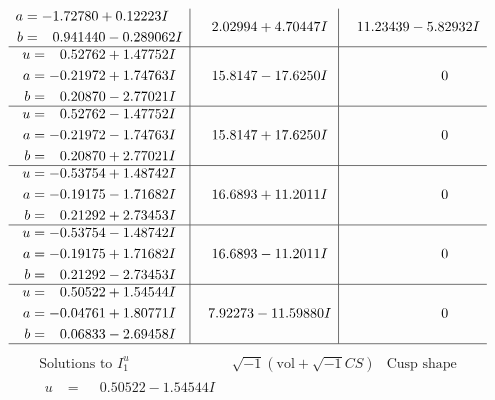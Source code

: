 \documentclass[1p]{elsarticle_modified}
\theoremstyle{definition}
\newcommand{\I}{\sqrt{-1}}
\begin{document}
$$\begin{array}{c|c|c}
\begin{aligned}
a &= -1.72780 + 0.12223 I \\
b &= \phantom{-}0.941440 - 0.289062 I\end{aligned}
 & \phantom{-}2.02994 + 4.70447 I & \phantom{-}11.23439 - 5.82932 I \\ \hline\begin{aligned}
u &= \phantom{-}0.52762 + 1.47752 I \\
a &= -0.21972 + 1.74763 I \\
b &= \phantom{-}0.20870 - 2.77021 I\end{aligned}
 & \phantom{-}15.8147 - 17.6250 I & \phantom{-0.000000 } 0 \\ \hline\begin{aligned}
u &= \phantom{-}0.52762 - 1.47752 I \\
a &= -0.21972 - 1.74763 I \\
b &= \phantom{-}0.20870 + 2.77021 I\end{aligned}
 & \phantom{-}15.8147 + 17.6250 I & \phantom{-0.000000 } 0 \\ \hline\begin{aligned}
u &= -0.53754 + 1.48742 I \\
a &= -0.19175 - 1.71682 I \\
b &= \phantom{-}0.21292 + 2.73453 I\end{aligned}
 & \phantom{-}16.6893 + 11.2011 I & \phantom{-0.000000 } 0 \\ \hline\begin{aligned}
u &= -0.53754 - 1.48742 I \\
a &= -0.19175 + 1.71682 I \\
b &= \phantom{-}0.21292 - 2.73453 I\end{aligned}
 & \phantom{-}16.6893 - 11.2011 I & \phantom{-0.000000 } 0 \\ \hline\begin{aligned}
u &= \phantom{-}0.50522 + 1.54544 I \\
a &= -0.04761 + 1.80771 I \\
b &= \phantom{-}0.06833 - 2.69458 I\end{aligned}
 & \phantom{-}7.92273 - 11.59880 I & \phantom{-0.000000 } 0\\
 \hline 
 \end{array}$$\newpage$$\begin{array}{c|c|c}  
\text{Solutions to }I^u_{1}& \I (\text{vol} + \sqrt{-1}CS) & \text{Cusp shape}\\
 \hline 
\begin{aligned}
u &= \phantom{-}0.50522 - 1.54544 I \\

\end{aligned}
\end{array}$$
\end{document}
